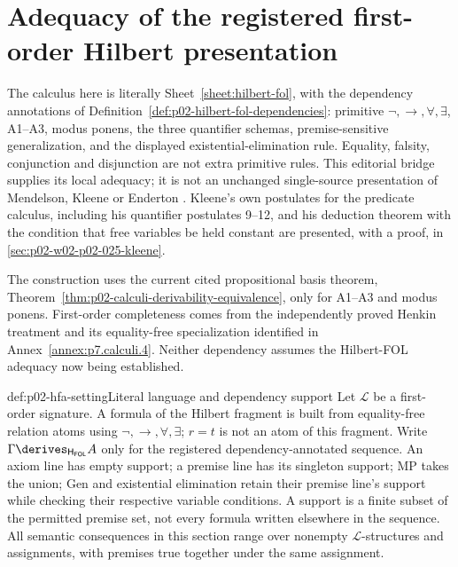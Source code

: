 \section{Adequacy of the registered first-order Hilbert presentation}
\label{sec:p02-hilbert-fol-adequacy}

The calculus here is literally Sheet~\ref{sheet:hilbert-fol}, with the
dependency annotations of Definition~\ref{def:p02-hilbert-fol-dependencies}:
primitive \(\neg,\to,\forall,\exists\), A1--A3, modus ponens, the three
quantifier schemas, premise-sensitive generalization, and the displayed
existential-elimination rule. Equality, falsity, conjunction and disjunction
are not extra primitive rules. This editorial bridge supplies its local
adequacy; it is not an unchanged single-source presentation of Mendelson,
Kleene or Enderton \cite{Mendelson1997,Kleene1952,Enderton2001}.
Kleene's own postulates for the predicate calculus, including his quantifier
postulates 9--12, and his deduction theorem with the condition that free
variables be held constant are presented, with a proof, in
\cref{sec:p02-w02-p02-025-kleene}.

The construction uses the current cited propositional basis theorem,
Theorem~\ref{thm:p02-calculi-derivability-equivalence}, only for A1--A3 and
modus ponens. First-order completeness comes from the independently proved
Henkin treatment and its equality-free specialization identified in
Annex~\ref{annex:p7.calculi.4}. Neither dependency assumes the Hilbert-FOL
adequacy now being established.

\begin{hbconvention}{def:p02-hfa-setting}{Literal language and dependency support}
Let \(\mathcal L\) be a first-order signature. A formula of the Hilbert
fragment is built from equality-free relation atoms using
\(\neg,\to,\forall,\exists\); \(r=t\) is not an atom of this fragment.
Write \(\Gamma\derives_{\mathsf H_{\mathsf{FOL}}}A\) only for the
registered dependency-annotated sequence. An axiom line has empty support;
a premise line has its singleton support; MP takes the union; Gen and
existential elimination retain their premise line's support while checking
their respective variable conditions. A support is a finite subset of
the permitted premise set, not every formula written elsewhere in the
sequence. All semantic consequences in this section range over nonempty
\(\mathcal L\)-structures and assignments, with premises true together
under the same assignment.
\end{hbconvention}

